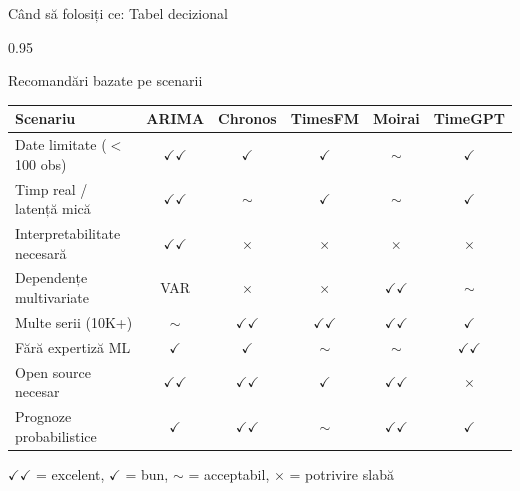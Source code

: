 \documentclass[9pt, aspectratio=169, t]{beamer}
\begin{document}
\begin{frame}{Când să folosiți ce: Tabel decizional}
    \begin{cminipage}{0.95\textwidth}
    \vspace{-3mm}
    {\scriptsize
    \begin{block}{Recomandări bazate pe scenarii}
    \vspace{-2mm}
    \begin{center}
    \begin{tabular}{l|c|c|c|c|c}
        \toprule
        \textbf{Scenariu} & \textbf{ARIMA} & \textbf{Chronos} & \textbf{TimesFM} & \textbf{Moirai} & \textbf{TimeGPT} \\
        \midrule
        Date limitate ($<$100 obs) & $\checkmark\checkmark$ & $\checkmark$ & $\checkmark$ & $\sim$ & $\checkmark$ \\
        Timp real / latență mică & $\checkmark\checkmark$ & $\sim$ & $\checkmark$ & $\sim$ & $\checkmark$ \\
        Interpretabilitate necesară & $\checkmark\checkmark$ & $\times$ & $\times$ & $\times$ & $\times$ \\
        Dependențe multivariate & VAR & $\times$ & $\times$ & $\checkmark\checkmark$ & $\sim$ \\
        Multe serii (10K+) & $\sim$ & $\checkmark\checkmark$ & $\checkmark\checkmark$ & $\checkmark\checkmark$ & $\checkmark$ \\
        Fără expertiză ML & $\checkmark$ & $\checkmark$ & $\sim$ & $\sim$ & $\checkmark\checkmark$ \\
        Open source necesar & $\checkmark\checkmark$ & $\checkmark\checkmark$ & $\checkmark$ & $\checkmark\checkmark$ & $\times$ \\
        Prognoze probabilistice & $\checkmark$ & $\checkmark\checkmark$ & $\sim$ & $\checkmark\checkmark$ & $\checkmark$ \\
        \bottomrule
    \end{tabular}
    \end{center}
    \vspace{-2mm}
    {\scriptsize $\checkmark\checkmark$ = excelent, $\checkmark$ = bun, $\sim$ = acceptabil, $\times$ = potrivire slabă}
    \end{block}
    }
    \end{cminipage}
\end{frame}
\end{document}
